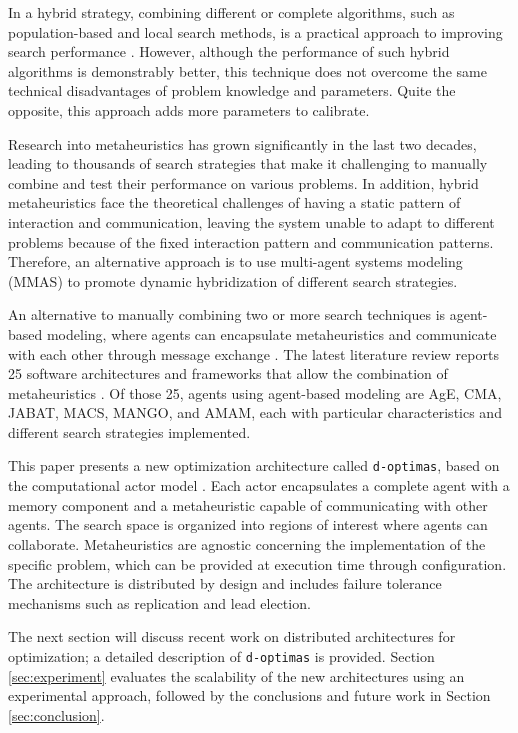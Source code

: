 \documentclass[preprint,12pt]{elsarticle}
\begin{document}
In a hybrid strategy, combining different or complete algorithms, such as population-based and local search methods, is a practical approach to improving search performance \cite{dokeroglu2019}. However, although the performance of such hybrid algorithms is demonstrably better, this technique does not overcome the same technical disadvantages of problem knowledge and parameters. Quite the opposite, this approach adds more parameters to calibrate.

Research into metaheuristics has grown significantly in the last two decades, leading to thousands of search strategies that make it challenging to manually combine and test their performance on various problems. In addition, hybrid metaheuristics face the theoretical challenges of having a static pattern of interaction and communication, leaving the system unable to adapt to different problems because of the fixed interaction pattern and communication patterns. Therefore, an alternative approach is to use multi-agent systems modeling (MMAS) to promote dynamic hybridization of different search strategies.

An alternative to manually combining two or more search techniques is agent-based modeling, where agents can encapsulate metaheuristics and communicate with each other through message exchange \cite{gong2015, zheng2015}. The latest literature review reports 25 software architectures and frameworks that allow the combination of metaheuristics \cite{silva2018}. Of those 25, agents using agent-based modeling are AgE, CMA, JABAT, MACS, MANGO, and AMAM, each with particular characteristics and different search strategies implemented. 

This paper presents a new optimization architecture called \texttt{d-optimas}, based on the computational actor model \cite{hewitt2013}. Each actor encapsulates a complete agent with a memory component and a metaheuristic capable of communicating with other agents. The search space is organized into regions of interest where agents can collaborate. Metaheuristics are agnostic concerning the implementation of the specific problem, which can be provided at execution time through configuration. The architecture is distributed by design and includes failure tolerance mechanisms such as replication and lead election. 

The next section will discuss recent work on distributed architectures for optimization; a detailed description of \texttt{d-optimas} is provided. Section \ref{sec:experiment} 
 evaluates the scalability of the new architectures using an experimental approach, followed by the conclusions and future work in Section \ref{sec:conclusion}. 
\end{document}

